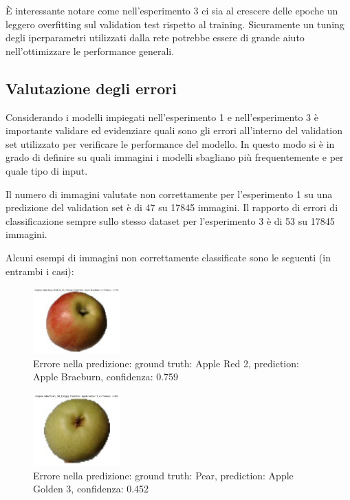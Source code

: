 È interessante notare come nell'esperimento 3 ci sia al crescere delle epoche un leggero overfitting sul validation test rispetto al training. Sicuramente un tuning degli iperparametri utilizzati dalla rete potrebbe essere di grande aiuto nell'ottimizzare le performance generali.

\subsection{Valutazione degli errori}

Considerando i modelli impiegati nell'esperimento 1 e nell'esperimento 3 è importante validare ed evidenziare quali sono gli errori all'interno del validation set utilizzato per verificare le performance del modello.
In questo modo si è in grado di definire su quali immagini i modelli sbagliano più frequentemente e per quale tipo di input.

Il numero di immagini valutate non correttamente per l'esperimento 1 su una predizione del validation set è di 47 su 17845 immagini.
Il rapporto di errori di classificazione sempre sullo stesso dataset per l'esperimento 3 è di 53 su 17845 immagini.

Alcuni esempi di immagini non correttamente classificate sono le seguenti (in entrambi i casi):

\begin{figure}[H]
    \centering
    \includegraphics[width=0.3\textwidth]{./resources/error1.png}
    \caption{Errore nella predizione: ground truth: Apple Red 2, prediction: Apple Braeburn, confidenza: 0.759} 
    \label{fig:mela}
\end{figure}

\begin{figure}[H]
    \centering
    \includegraphics[width=0.3\textwidth]{./resources/error2.png}
    \caption{Errore nella predizione: ground truth: Pear, prediction: Apple Golden 3, confidenza: 0.452} 
    \label{fig:mela}
\end{figure}

